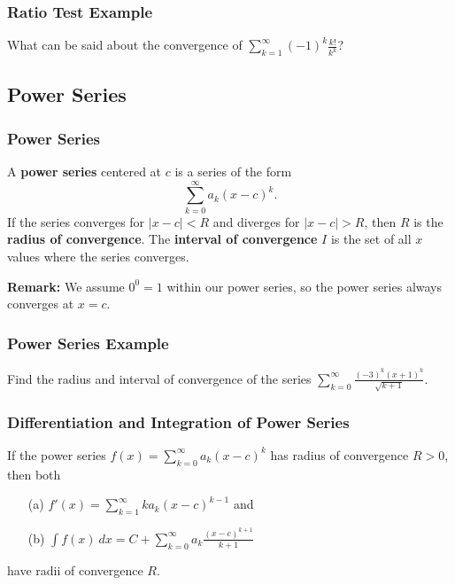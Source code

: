 \documentclass{beamer}
\begin{document}
 \begin{frame}[t]
  \frametitle{Ratio Test Example} 
  \begin{Example}
What can be said about the convergence of $\displaystyle\sum_{k = 1}^\infty (-1)^k\frac{k!}{k^k}$?
\end{Example}
\end{frame}

\subsection{Power Series}

\begin{frame}
\frametitle{Power Series}
\begin{Definition}
A {\bf power series} centered at $c$ is a series of the form
$$
\sum_{k = 0}^\infty a_k (x - c)^k.
$$
If the series converges for $|x - c| < R$ and diverges for $|x - c| > R$, then $R$ is the {\bf radius of convergence}. The {\bf interval of convergence} $I$ is the set of all $x$ values where the series converges. 
\end{Definition}
{\bf Remark:} We assume $0^0 = 1$ within our power series, so the power series always converges at $x = c$.
\end{frame}

\begin{frame}[t]
\frametitle{Power Series Example}
\begin{Example}
Find the radius and interval of convergence of the series $\displaystyle\sum_{k = 0}^\infty \frac{(-3)^k (x + 1)^k}{\sqrt{k + 1}}$.
\end{Example}

\end{frame}

\begin{frame}
\frametitle{Differentiation and Integration of Power Series}
\begin{Theorem}
If the power series $f(x) = \displaystyle\sum_{k = 0}^\infty a_k (x - c)^k$ has radius of convergence $R > 0$, then both
\begin{enumerate}
\item[(a)] $\displaystyle f'(x) = \sum_{k = 1}^\infty k a_k (x - c)^{k - 1}$ and
\item[(b)] $\displaystyle\int f(x)\ dx = C + \sum_{k = 0}^\infty a_k \frac{(x - c)^{k + 1}}{k + 1}$
\end{enumerate}
have radii of convergence $R$.
\end{Theorem}
\end{frame}
\end{document}
